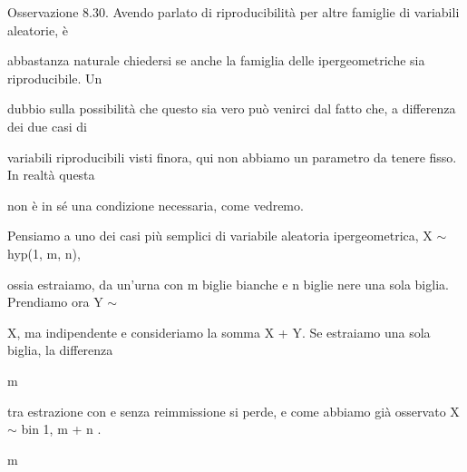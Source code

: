 \documentclass[a4paper,portrait,12pt]{article}
\begin{document}
\begin{flushleft}
Osservazione 8.30. Avendo parlato di riproducibilit\`{a} per altre famiglie di variabili aleatorie, \`{e}
\end{flushleft}


\begin{flushleft}
abbastanza naturale chiedersi se anche la famiglia delle ipergeometriche sia riproducibile. Un
\end{flushleft}


\begin{flushleft}
dubbio sulla possibilit\`{a} che questo sia vero pu\`{o} venirci dal fatto che, a differenza dei due casi di
\end{flushleft}


\begin{flushleft}
variabili riproducibili visti finora, qui non abbiamo un parametro da tenere fisso. In realt\`{a} questa
\end{flushleft}


\begin{flushleft}
non \`{e} in s\'{e} una condizione necessaria, come vedremo.
\end{flushleft}


\begin{flushleft}
Pensiamo a uno dei casi più semplici di variabile aleatoria ipergeometrica, X $\sim$ hyp(1, m, n),
\end{flushleft}


\begin{flushleft}
ossia estraiamo, da un'urna con m biglie bianche e n biglie nere una sola biglia. Prendiamo ora Y $\sim$
\end{flushleft}


\begin{flushleft}
X, ma indipendente e consideriamo la somma X + Y. Se estraiamo una sola biglia, la differenza
\end{flushleft}


\begin{flushleft}
m
\end{flushleft}


\begin{flushleft}
tra estrazione con e senza reimmissione si perde, e come abbiamo gi\`{a} osservato X $\sim$ bin 1, m + n .
\end{flushleft}


\begin{flushleft}
m
\end{flushleft}
\end{document}
